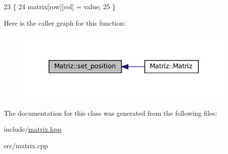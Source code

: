 \begin{DoxyCode}
23 \{
24   matrix[row][col] = value;
25 \}
\end{DoxyCode}
Here is the caller graph for this function\+:\nopagebreak
\begin{figure}[H]
\begin{center}
\leavevmode
\includegraphics[width=311pt]{classMatriz_a71fea2383ce785254c2f27da25ef70c8_icgraph}
\end{center}
\end{figure}


The documentation for this class was generated from the following files\+:\begin{DoxyCompactItemize}
\item 
include/\hyperlink{matrix_8hpp}{matrix.\+hpp}\item 
src/matrix.\+cpp\end{DoxyCompactItemize}

